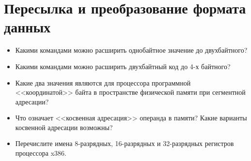 \chapter{Пересылка и преобразование формата данных}
\begin{itemize}
\item Какими командами можно расширить однобайтное значение до двухбайтного?
\item Какими командами можно расширить двухбайтный код до 4-х байтного?
\item Какие два значения являются для процессора программной <<координатой>> байта в пространстве физической памяти при сегментной адресации?
\item Что означает <<косвенная адресация>> операнда в памяти? Какие варианты косвенной адресации возможны?
\item Перечислите имена 8-разрядных, 16-разрядных и 32-разрядных регистров процессора x386.
\end{itemize}
\endinput